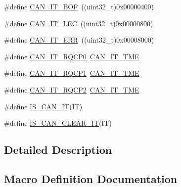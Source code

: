 \begin{DoxyCompactItemize}
\item 
\#define \mbox{\hyperlink{group___c_a_n__interrupts_gad63c39e6237aa07681a1f8ce2ff9e167}{C\+A\+N\+\_\+\+I\+T\+\_\+\+B\+OF}}~((uint32\+\_\+t)0x00000400)
\item 
\#define \mbox{\hyperlink{group___c_a_n__interrupts_gad670b6f001bf67f24e17d91ada50a61c}{C\+A\+N\+\_\+\+I\+T\+\_\+\+L\+EC}}~((uint32\+\_\+t)0x00000800)
\item 
\#define \mbox{\hyperlink{group___c_a_n__interrupts_ga65f1781c9165a2e9b5f77f1ed3990741}{C\+A\+N\+\_\+\+I\+T\+\_\+\+E\+RR}}~((uint32\+\_\+t)0x00008000)
\item 
\#define \mbox{\hyperlink{group___c_a_n__interrupts_ga0c57058d6d14b2baa24a4895975b1371}{C\+A\+N\+\_\+\+I\+T\+\_\+\+R\+Q\+C\+P0}}~\mbox{\hyperlink{group___c_a_n__interrupts_ga619e36230fa2eb089a7c1936b5004eb9}{C\+A\+N\+\_\+\+I\+T\+\_\+\+T\+ME}}
\item 
\#define \mbox{\hyperlink{group___c_a_n__interrupts_ga42e5c8e89e0f06f3250916fcfb21dc22}{C\+A\+N\+\_\+\+I\+T\+\_\+\+R\+Q\+C\+P1}}~\mbox{\hyperlink{group___c_a_n__interrupts_ga619e36230fa2eb089a7c1936b5004eb9}{C\+A\+N\+\_\+\+I\+T\+\_\+\+T\+ME}}
\item 
\#define \mbox{\hyperlink{group___c_a_n__interrupts_gacc634c3e29cdc9622081021dcda3127b}{C\+A\+N\+\_\+\+I\+T\+\_\+\+R\+Q\+C\+P2}}~\mbox{\hyperlink{group___c_a_n__interrupts_ga619e36230fa2eb089a7c1936b5004eb9}{C\+A\+N\+\_\+\+I\+T\+\_\+\+T\+ME}}
\item 
\#define \mbox{\hyperlink{group___c_a_n__interrupts_gac0a9467bb0028c5fcd15a8a0ec6aaecb}{I\+S\+\_\+\+C\+A\+N\+\_\+\+IT}}(IT)
\item 
\#define \mbox{\hyperlink{group___c_a_n__interrupts_ga8b6e5fd6ddfe0141925f1e22cfbe7b85}{I\+S\+\_\+\+C\+A\+N\+\_\+\+C\+L\+E\+A\+R\+\_\+\+IT}}(IT)
\end{DoxyCompactItemize}


\subsection{Detailed Description}


\subsection{Macro Definition Documentation}
\mbox{\label{group___c_a_n__interrupts_gad63c39e6237aa07681a1f8ce2ff9e167}} 
